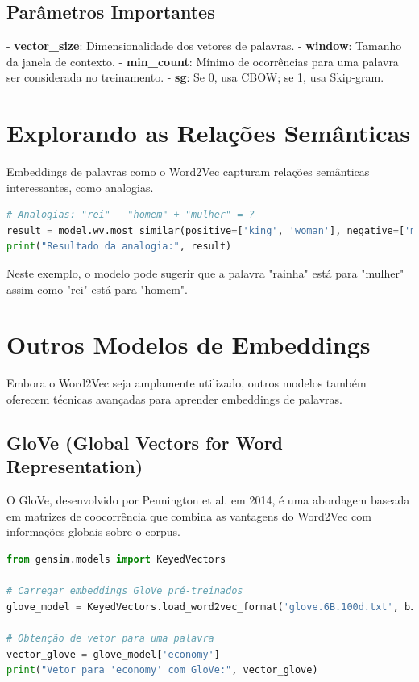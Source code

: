 \documentclass[14pt,a4paper,oneside]{book}
\begin{document}
\subsection{Parâmetros Importantes}
- \textbf{vector\_size}: Dimensionalidade dos vetores de palavras.
- \textbf{window}: Tamanho da janela de contexto.
- \textbf{min\_count}: Mínimo de ocorrências para uma palavra ser considerada no treinamento.
- \textbf{sg}: Se 0, usa CBOW; se 1, usa Skip-gram.

\section{Explorando as Relações Semânticas}

Embeddings de palavras como o Word2Vec capturam relações semânticas interessantes, como analogias.

\begin{lstlisting}[language=Python]
# Analogias: "rei" - "homem" + "mulher" = ?
result = model.wv.most_similar(positive=['king', 'woman'], negative=['man'])
print("Resultado da analogia:", result)
\end{lstlisting}

Neste exemplo, o modelo pode sugerir que a palavra "rainha" está para "mulher" assim como "rei" está para "homem".

\section{Outros Modelos de Embeddings}

Embora o Word2Vec seja amplamente utilizado, outros modelos também oferecem técnicas avançadas para aprender embeddings de palavras.

\subsection{GloVe (Global Vectors for Word Representation)}
O GloVe, desenvolvido por Pennington et al. em 2014, é uma abordagem baseada em matrizes de coocorrência que combina as vantagens do Word2Vec com informações globais sobre o corpus.

\begin{lstlisting}[language=Python]
from gensim.models import KeyedVectors

# Carregar embeddings GloVe pré-treinados
glove_model = KeyedVectors.load_word2vec_format('glove.6B.100d.txt', binary=False)

# Obtenção de vetor para uma palavra
vector_glove = glove_model['economy']
print("Vetor para 'economy' com GloVe:", vector_glove)
\end{lstlisting}
\end{document}
